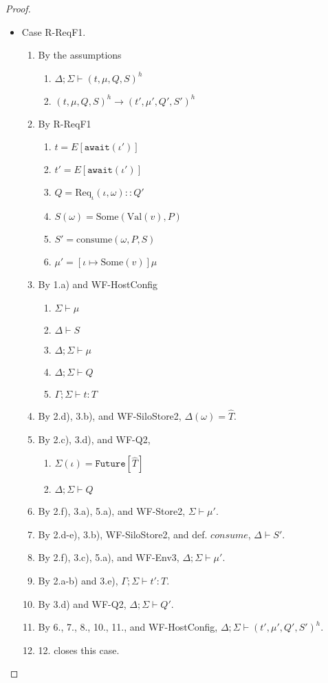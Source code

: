 \documentclass{article}
\theoremstyle{definition}
\newcommand{\Val}[1]{\text{Val}(#1)}
\newcommand{\ReqF}[2]{\text{Req}_{\iota}(#1, #2)}
\newcommand{\consume}[3]{\text{consume}(#1, #2, #3)}
\begin{document}
\begin{proof}
\begin{itemize}
\item Case R-ReqF1.
\begin{enumerate}
\item By the assumptions
  \begin{enumerate}[label=(\alph*)]
  \item $\Delta ; \Sigma \vdash (t, \mu, Q, S)^h$
  \item $(t, \mu, Q, S)^h \longrightarrow (t', \mu', Q', S')^h$
  \end{enumerate}
\item By R-ReqF1
  \begin{enumerate}[label=(\alph*)]
  \item $t = E[\texttt{await}(\iota')]$
  \item $t' = E[\texttt{await}(\iota')]$
  \item $Q = {\ReqF \iota \omega} :: Q'$
  \item $S(\omega) = \text{Some}(\Val{v}, P)$
  \item $S' = {\consume \omega P S}$
  \item $\mu' = [\iota \mapsto \text{Some}(v)]\mu$
  \end{enumerate}
\item By 1.a) and WF-HostConfig
  \begin{enumerate}[label=(\alph*)]
  \item $\Sigma \vdash \mu$
  \item $\Delta \vdash S$
  \item $\Delta ; \Sigma \vdash \mu$
  \item $\Delta ; \Sigma \vdash Q$
  \item $\Gamma ; \Sigma \vdash t : T$
  \end{enumerate}
\item By 2.d), 3.b), and WF-SiloStore2, $\Delta(\omega) = \hat{T}$.
\item By 2.c), 3.d), and WF-Q2,
  \begin{enumerate}[label=(\alph*)]
  \item $\Sigma(\iota) = \texttt{Future}[\hat{T}]$
  \item $\Delta ; \Sigma \vdash Q$
  \end{enumerate}
\item By 2.f), 3.a), 5.a), and WF-Store2, $\Sigma \vdash \mu'$.
\item By 2.d-e), 3.b), WF-SiloStore2, and def. $consume$, $\Delta \vdash S'$.
\item By 2.f), 3.c), 5.a), and WF-Env3, $\Delta ; \Sigma \vdash \mu'$.
\item By 2.a-b) and 3.e), $\Gamma ; \Sigma \vdash t' : T$.
\item By 3.d) and WF-Q2, $\Delta ; \Sigma \vdash Q'$.
\item By 6., 7., 8., 10., 11., and WF-HostConfig, $\Delta ; \Sigma \vdash (t', \mu', Q', S')^h$.
\item 12. closes this case.
\end{enumerate}


\end{itemize}
\end{proof}
\end{document}
